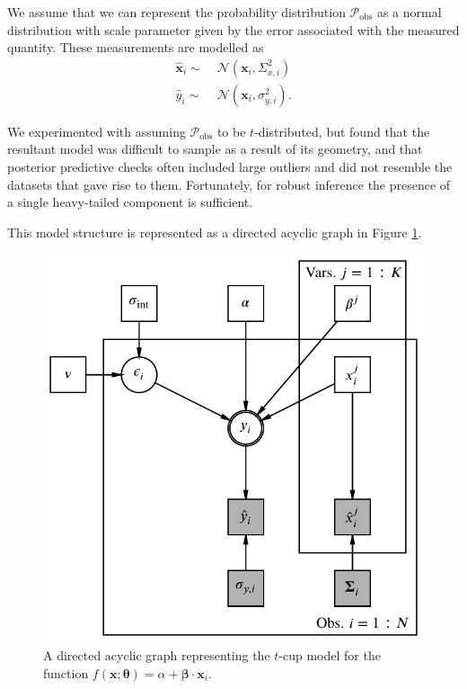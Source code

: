 \documentclass[fleqn,usenatbib]{rasti}
\newcommand{\indepvars}{\boldsymbol{x}_i}
\newcommand{\obsdep}{\hat{y}_i}
\newcommand{\obsindep}{\hat{\boldsymbol{x}}_i}
\newcommand{\indepcov}{\Sigma_{x, i}}
\newcommand{\deperr}{\sigma_{y, i}}
\begin{document}
We assume that we can represent the probability distribution
$\mathcal P_{\text{obs}}$ as a normal distribution with scale parameter given by
the error associated with the measured quantity. These measurements are modelled
as
\begin{align}
    \obsindep \sim&\; \mathcal N\left({\indepvars}, \indepcov^2\right) \\
    \obsdep \sim&\; \mathcal N\left({\indepvars}, \deperr^2\right).
\end{align}

We experimented with assuming $\mathcal P_{\text{obs}}$ to be $t$-distributed,
but found that the resultant model was difficult to sample as a result of its
geometry, and that posterior predictive checks often included large outliers
and did not resemble the datasets that gave rise to them.  Fortunately, for robust inference the presence of a single heavy-tailed component is sufficient.

This model structure is represented as a directed acyclic graph in Figure
\ref{fig:formalism.dag}.

\begin{figure}
	\includegraphics[width=\columnwidth]{graphics/dag.pdf}
    \caption{A directed acyclic graph representing the $t$-cup model for the
    function $f(\boldsymbol{x}; \boldsymbol{\theta}) = \alpha +
    \boldsymbol{\beta} \cdot \boldsymbol{x}_i$.}
    \label{fig:formalism.dag}
\end{figure}
\end{document}
